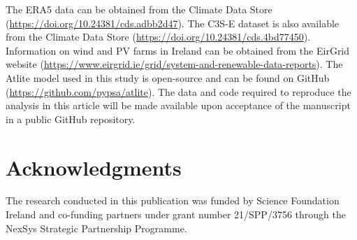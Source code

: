 \documentclass[preprint, 12pt]{elsarticle}
\begin{document}
The ERA5 data can be obtained from the Climate Data Store (\url{https://doi.org/10.24381/cds.adbb2d47}). The C3S-E dataset is also available from the Climate Data Store (\url{https://doi.org/10.24381/cds.4bd77450}). Information on wind and PV farms in Ireland can be obtained from the EirGrid website (\url{https://www.eirgrid.ie/grid/system-and-renewable-data-reports}). The Atlite model used in this study is open-source and can be found on GitHub (\url{https://github.com/pypsa/atlite}). The data and code required to reproduce the analysis in this article will be made available upon acceptance of the manuscript in a public GitHub repository.

\section*{Acknowledgments}

The research conducted in this publication was funded by Science Foundation Ireland and co-funding partners under grant number 21/SPP/3756 through the NexSys Strategic Partnership Programme.



\end{document}
